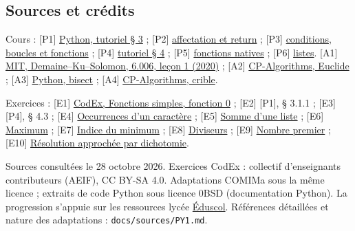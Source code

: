 \documentclass[11pt]{article}
\begin{document}
\subsection*{Sources et crédits}
{\footnotesize
Cours : [P1] \href{https://docs.python.org/3.14/tutorial/introduction.html}{Python, tutoriel § 3} ;
[P2] \href{https://docs.python.org/3.14/reference/simple_stmts.html}{affectation et return} ;
[P3] \href{https://docs.python.org/3.14/reference/compound_stmts.html}{conditions, boucles et fonctions} ;
[P4] \href{https://docs.python.org/3.14/tutorial/controlflow.html}{tutoriel § 4} ;
[P5] \href{https://docs.python.org/3.14/library/functions.html}{fonctions natives} ;
[P6] \href{https://docs.python.org/3.14/tutorial/datastructures.html}{listes}.
[A1] \href{https://ocw.mit.edu/courses/6-006-introduction-to-algorithms-spring-2020/resources/lecture-1-algorithms-and-computation/}{MIT, Demaine--Ku--Solomon, 6.006, leçon 1 (2020)} ;
[A2] \href{https://cp-algorithms.com/algebra/euclid-algorithm.html}{CP-Algorithms, Euclide} ;
[A3] \href{https://docs.python.org/3.14/library/bisect.html}{Python, bisect} ;
[A4] \href{https://cp-algorithms.com/algebra/sieve-of-eratosthenes.html}{CP-Algorithms, crible}.

Exercices : [E1] \href{https://codex.forge.apps.education.fr/exercices/fonctions/}{CodEx, Fonctions simples, fonction 0} ;
[E2] [P1], § 3.1.1 ; [E3] [P4], § 4.3 ;
[E4] \href{https://codex.forge.apps.education.fr/exercices/cpt_occurrences/}{Occurrences d'un caractère} ;
[E5] \href{https://codex.forge.apps.education.fr/exercices/somme_entiers/}{Somme d'une liste} ;
[E6] \href{https://codex.forge.apps.education.fr/exercices/maximum_nombres/}{Maximum} ;
[E7] \href{https://codex.forge.apps.education.fr/exercices/ind_min/}{Indice du minimum} ;
[E8] \href{https://codex.forge.apps.education.fr/exercices/diviseurs/}{Diviseurs} ;
[E9] \href{https://codex.forge.apps.education.fr/exercices/nombre_premier/}{Nombre premier} ;
[E10] \href{https://codex.forge.apps.education.fr/exercices/dicho_maths/}{Résolution approchée par dichotomie}.

Sources consultées le 28 octobre 2026. Exercices CodEx : collectif d'enseignants contributeurs (AEIF), CC BY-SA 4.0. Adaptations COMIMa sous la même licence ; extraits de code Python sous licence 0BSD (documentation Python). La progression s'appuie sur les ressources lycée \href{https://eduscol.education.gouv.fr/5817/programmes-et-ressources-en-mathematiques-voie-gt}{Éduscol}. Références détaillées et nature des adaptations : \texttt{docs/sources/PY1.md}.
}
\end{document}
